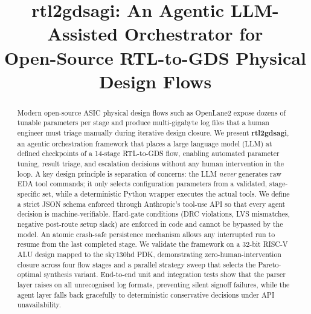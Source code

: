 \documentclass[conference]{IEEEtran}
\begin{document}
\title{rtl2gdsagi: An Agentic LLM-Assisted Orchestrator for\\
Open-Source RTL-to-GDS Physical Design Flows}

\author{
}

\maketitle

\begin{abstract}
Modern open-source ASIC physical design flows such as OpenLane2 expose
dozens of tunable parameters per stage and produce multi-gigabyte log
files that a human engineer must triage manually during iterative
design closure.
We present \textbf{rtl2gdsagi}, an agentic orchestration framework that
places a large language model (LLM) at defined checkpoints of a
14-stage RTL-to-GDS flow, enabling automated parameter tuning, result
triage, and escalation decisions without any human intervention in the
loop.
A key design principle is separation of concerns: the LLM \emph{never}
generates raw EDA tool commands; it only selects configuration
parameters from a validated, stage-specific set, while a deterministic
Python wrapper executes the actual tools.
We define a strict JSON schema enforced through Anthropic's tool-use
API so that every agent decision is machine-verifiable.
Hard-gate conditions (DRC violations, LVS mismatches, negative
post-route setup slack) are enforced in code and cannot be bypassed by
the model.
An atomic crash-safe persistence mechanism allows any interrupted run
to resume from the last completed stage.
We validate the framework on a 32-bit RISC-V ALU design mapped to the
sky130hd PDK, demonstrating zero-human-intervention closure across
four flow stages and a parallel strategy sweep that selects the
Pareto-optimal synthesis variant.
End-to-end unit and integration tests show that the parser layer raises
on all unrecognised log formats, preventing silent signoff failures,
while the agent layer falls back gracefully to deterministic conservative
decisions under API unavailability.
\end{abstract}
\end{document}
